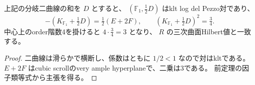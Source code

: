 \begin{corollary}[ramified対のFano次数]
上記の分岐二曲線の和を $D$ とすると、
$(\mathbb F_1,\tfrac12D)$ はklt log del Pezzo対であり、
\[
 -(K_{\mathbb F_1}+\tfrac12D)=\tfrac12(E+2F),\qquad
 (K_{\mathbb F_1}+\tfrac12D)^2=\tfrac34.
\]
中心上のorder階数4を掛けると $4\cdot\tfrac34=3$ となり、
$R$ の三次曲面Hilbert値と一致する。
\end{corollary}
\begin{proof}
二曲線は滑らかで横断し、係数はともに $1/2<1$ なので対はkltである。
$E+2F$ はcubic scrollのvery ample hyperplaneで、二乗は3である。
前定理の因子類等式から主張を得る。
\end{proof}
